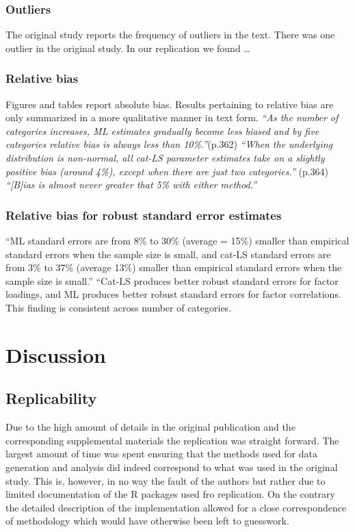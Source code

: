 \documentclass[10,a4paperpaper,]{article}
\begin{document}
\subsubsection{Outliers}

The original study reports the frequency of outliers in the text. There
was one outlier in the original study. In our replication we found
\ldots{}

\subsubsection{Relative bias}

Figures and tables report absolute bias. Results pertaining to relative
bias are only summarized in a more qualitative manner in text form.
\emph{``As the number of categories increases, ML estimates gradually
become less biased and by five categories relative bias is always less
than 10\%.''}(p.362) \emph{``When the underlying distribution is
non-normal, all cat-LS parameter estimates take on a slightly positive
bias (around 4\%), except when there are just two categories.''} (p.364)
\emph{``{[}B{]}ias is almost never greater that 5\% with either
method.''}

\subsubsection{Relative bias for robust standard error estimates}

``ML standard errors are from 8\% to 30\% (average = 15\%) smaller than
empirical standard errors when the sample size is small, and cat-LS
standard errors are from 3\% to 37\% (average 13\%) smaller than
empirical standard errors when the sample size is small.'' ``Cat-LS
produces better robust standard errors for factor loadings, and ML
produces better robust standard errors for factor correlations. This
finding is consistent across number of categories.

\FloatBarrier
\section{Discussion}

\subsection{Replicability}

Due to the high amount of details in the original publication and the
corresponding supplemental materials the replication was straight
forward. The largest amount of time was spent ensuring that the methods
used for data generation and analysis did indeed correspond to what was
used in the original study. This is, however, in no way the fault of the
authors but rather due to limited documentation of the R packages used
fro replication. On the contrary the detailed description of the
implementation allowed for a close correspondence of methodology which
would have otherwise been left to guesswork.
\end{document}
